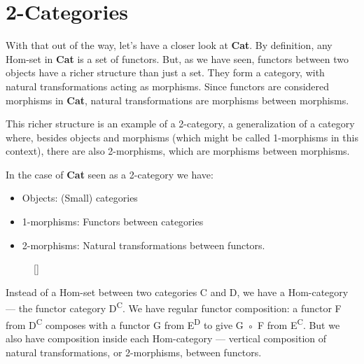 \section{2-Categories}\label{categories}

With that out of the way, let's have a closer look at \textbf{Cat}. By
definition, any Hom-set in \textbf{Cat} is a set of functors. But, as we
have seen, functors between two objects have a richer structure than
just a set. They form a category, with natural transformations acting as
morphisms. Since functors are considered morphisms in \textbf{Cat},
natural transformations are morphisms between morphisms.

This richer structure is an example of a 2-category, a generalization of
a category where, besides objects and morphisms (which might be called
1-morphisms in this context), there are also 2-morphisms, which are
morphisms between morphisms.

In the case of \textbf{Cat} seen as a 2-category we have:

\begin{itemize}
\tightlist
\item
  Objects: (Small) categories
\item
  1-morphisms: Functors between categories
\item
  2-morphisms: Natural transformations between functors.
\end{itemize}

\begin{figure}
\raisebox{0pt}[\dimexpr{}\baselineskip\relax]{
}%
\end{figure}

\noindent
Instead of a Hom-set between two categories C and D, we have a
Hom-category --- the functor category D\textsuperscript{C}. We have
regular functor composition: a functor F from D\textsuperscript{C}
composes with a functor G from E\textsuperscript{D} to give G ◦ F from
E\textsuperscript{C}. But we also have composition inside each
Hom-category --- vertical composition of natural transformations, or
2-morphisms, between functors.

